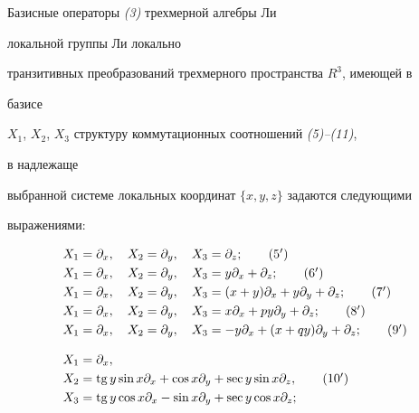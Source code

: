 \begin{thmnonum} Базисные операторы {\em (3)} трехмерной алгебры Ли 


локальной группы Ли локально 


транзитивных преобразований трехмерного пространства $R^3$, имеющей в 


базисе 


$X_1$, $X_2$, $X_3$ структуру коммутационных соотношений {\em (5)--(11)}, 


в надлежаще 


выбранной системе локальных координат $\{x,y,z\}$ задаются следующими 


выражениями: 


\begin{align} 


X_1&=\partial_x,\quad X_2=\partial_y,\quad X_3=\partial_z; 


\tag{5${}'$}\\ 


% 


X_1&=\partial_x,\quad X_2=\partial_y,\quad 


X_3=y\partial_x+\partial_z;\tag{6${}'$}\\ 


% 


X_1&=\partial_x,\quad X_2=\partial_y,\quad 


X_3=(x+y)\partial_x+y\partial_y+\partial_z;\tag{7${}'$}\\ 


% 


X_1&=\partial_x,\quad X_2=\partial_y,\quad 


X_3=x\partial_x+py\partial_y+\partial_z;\tag{8${}'$}\\ 


% 


X_1&=\partial_x,\quad X_2=\partial_y,\quad 


X_3=-y\partial_x+(x+qy)\partial_y+\partial_z;\tag{9${}'$}\\[3mm] 


% 


X_1&=\partial_x,\notag \\


X_2&=\tg y\sin x\partial_x+\cos x\partial_y+ 


\sec y\sin x\partial_z,\tag{10${}'$}\\ 


% 


X_3&=\tg y\cos x\partial_x-\sin x\partial_y+ 


\sec y\cos x\partial_z;\notag\\[3mm] 



\end{align}
\end{thmnonum}
